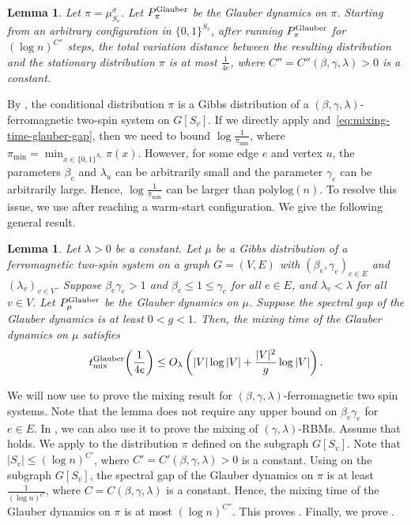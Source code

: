 \documentclass[11pt]{amsart}
\newcommand{\tp}[1]{{\left( #1 \right)}}
\newtheorem{lemma}[theorem]{Lemma}
\theoremstyle{definition}
\theoremstyle{remark}
\begin{document}
\begin{lemma}\label{lemma:warm-start-configuration}
Let $\pi = \mu^\sigma_{S_v}$. Let $P_{\pi}^{\textnormal{Glauber}}$ be the Glauber dynamics on $\pi$. Starting from an arbitrary configuration in $\{0,1\}^{S_v}$, after running $P_{\pi}^{\textnormal{Glauber}}$ for $(\log n)^{C''}$ steps, the total variation distance between the resulting distribution and the stationary distribution $\pi$ is at most $\frac{1}{4e}$, where $C'' = C''(\beta,\gamma,\lambda) > 0$ is a constant.
\end{lemma}

By , the conditional distribution $\pi$ is a Gibbs distribution of a $(\beta,\gamma,\lambda)$-ferromagnetic two-spin system on $G[S_v]$.
If we directly apply  and~\eqref{eq:mixing-time-glauber-gap}, then we need to bound $\log \frac{1}{\pi_{\min}}$, where $\pi_{\min} = \min_{x \in \{0,1\}^{S_v}} \pi(x)$. 
However, for some edge $e$ and vertex $u$, the parameters $\beta_e$ and $\lambda_u$ can be arbitrarily small and the parameter $\gamma_e$ can be arbitrarily large. Hence, $\log \frac{1}{\pi_{\min}}$ can be larger than $\mathrm{polylog}(n)$. To resolve this issue, we use  after reaching a warm-start configuration.
We give the following general result.
\begin{lemma}\label{lemma:warm-start-configuration-general}
Let $\lambda > 0$ be a constant. 
Let $\mu$ be a Gibbs distribution of a ferromagnetic two-spin system on a graph $G = (V,E)$ with $(\beta_e,\gamma_e)_{e\in E}$ and $(\lambda_v)_{v \in V}$. 
Suppose $\beta_e \gamma_e > 1$ and $\beta_e \leq 1 \leq \gamma_e$ for all $e \in E$, and $\lambda_v < \lambda$ for all $v \in V$.
Let $P_{\mu}^{\textnormal{Glauber}}$ be the Glauber dynamics on $\mu$. Suppose the spectral gap of the Glauber dynamics is at least $0 < g < 1$.  Then, the mixing time of the Glauber dynamics on $\mu$ satisfies
\begin{align*}
t_{\textnormal{mix}}^{\textnormal{Glauber}}\tp{\frac{1}{4e}} \leq O_{\lambda}\left(|V| \log |V| + \frac{|V|^2}{g} \log |V|\right).
\end{align*}
\end{lemma}
We will now use  to prove the mixing result for $(\beta,\gamma,\lambda)$-ferromagnetic two spin systems.
Note that the lemma does not require any upper bound on $\beta_e \gamma_e$ for $e \in E$. In , we can also use it to prove the mixing of $(\gamma,\lambda)$-RBMs.
Assume that  holds. We apply  to the distribution $\pi$ defined on the subgraph $G[S_v]$. Note that $|S_v| \leq (\log n)^{C'}$, where $C' = C'(\beta,\gamma,\lambda) > 0$ is a constant.
Using  on the subgraph $G[S_v]$, the spectral gap of the Glauber dynamics on $\pi$ is at least $\frac{1}{(\log n)^{C}}$, where $C = C(\beta,\gamma,\lambda)$ is a constant.
Hence, the mixing time of the Glauber dynamics on $\pi$ is at most $(\log n)^{C''}$. This proves .
Finally, we prove .
\end{document}
